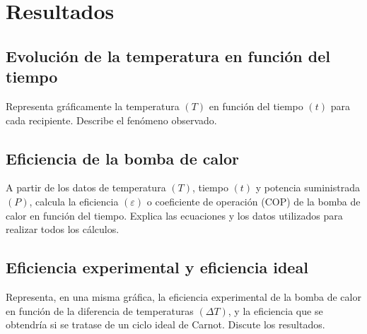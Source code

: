 
\def\numeroPractica{5}              %
\def\tituloPractica{Bomba de calor} %

\def\fechaPractica{dd/mm/aaaa} %
\def\fechaEntrega{dd/mm/aaaa}  %

\maketitle

\section{Resultados}

\subsection{Evolución de la temperatura en función del tiempo}

Representa gráficamente la temperatura $(T)$ en función del tiempo $(t)$ para cada recipiente. Describe el fenómeno observado.

\subsection{Eficiencia de la bomba de calor}

A partir de los datos de temperatura $(T)$, tiempo $(t)$ y potencia suministrada $(P)$, calcula la eficiencia $(\varepsilon)$ o coeficiente de operación (COP) de la bomba de calor en función del tiempo. Explica las ecuaciones y los datos utilizados para realizar todos los cálculos.

\subsection{Eficiencia experimental y eficiencia ideal}


Representa, en una misma gráfica, la eficiencia experimental de la bomba de calor en función de la diferencia de temperaturas $(\Delta T)$, y la eficiencia que se obtendría si se tratase de un ciclo ideal de Carnot. Discute los resultados.

